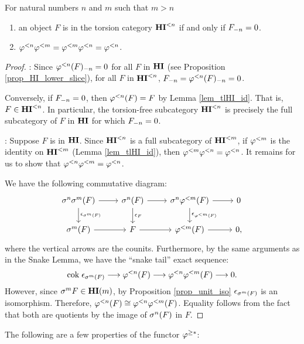 \begin{prop}\label{prop_TFHI_properties}
For natural numbers $n$ and $m$ such that $m > n$

\begin{enumerate}
\item an object $F$ is in the torsion category $\TFHI{n}$ if and 
only if $\RHI[n] F = 0$.
\tinyskip

\item $\tlHI{n}\tlHI{m} = \tlHI{m}\tlHI{n} = \tlHI{n}$.
\tinyskip
\end{enumerate}
\end{prop}
\begin{proof}
 : Since $\RHI[n]{\tlHI{n}(F)} = 0$ for all $F$ in 
$\HI$ (see Proposition \ref{prop_HI_lower_slice}), for all $F$ in
$\TFHI{n}$, $\RHI[n]{F} = \RHI[n]{\tlHI{n}(F)} = 0$.

Conversely, if $\RHI[n]{F} = 0$, then $\tlHI{n}(F) = F$ by Lemma
\ref{lem_tlHI_id}. That is, $F \in \TFHI{n}$. In particular, the
torsion-free subcategory $\TFHI{n}$ is precisely the full 
subcategory of $F$ in $\HI$ for which $\RHI[n]{F} = 0$.

 : Suppose $F$ is in $\HI$. Since $\TFHI{n}$ is a
full subcategory of $\TFHI{m}$, if $\tlHI{m}$ is the identity on 
$\TFHI{m}$ (Lemma \ref{lem_tlHI_id}), then $\tlHI{m}\tlHI{n} = 
\tlHI{n}$. It remains for us to show that $\tlHI{n}\tlHI{m} = 
\tlHI{n}$.

We have the following commutative diagram:
\[
\begin{tikzcd}
\sgHI{n}\sgHI{m}(F) \arrow{r}\arrow{d}{\cuHI_{\sgHI{m}(F)}} &
\sgHI{n}(F) \arrow{r}\arrow{d}{\cuHI_F} &
\sgHI{n}\tlHI{m}(F) \arrow{r}\arrow{d}{\cuHI_{\tlHI{m}(F)}} &
0 \\
\sgHI{m}(F) \arrow{r} &
F \arrow{r} &
\tlHI{m}(F) \arrow{r}&
0,
\end{tikzcd}
\]
where the vertical arrows are the counits. Furthermore, by the 
same arguments as in the Snake Lemma, we have the ``snake tail'' 
exact sequence:
\[
\cok \cuHI_{\sgHI{m}(F)} \to \tlHI{n}(F) \to \tlHI{n}\tlHI{m}(F) 
   \to 0.
\]
However, since $\sgHI{m}F \in \LHI[m]{\HI}$, by Proposition
\ref{prop_unit_iso} $\cuHI_{\sgHI{m}(F)}$ is an isomorphism. 
Therefore, $\tlHI{n}(F) \cong \tlHI{n}\tlHI{m}(F)$. Equality 
follows from the fact that both are quotients by the image of 
$\sgHI{n}(F)$ in $F$.
\end{proof}

The following are a few properties of the functor $\tgHI{*}$:

